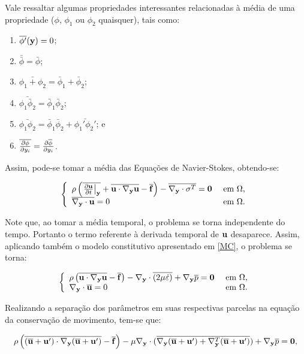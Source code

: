 \documentclass[_ArquivoPrincipal.tex]{subfiles}
\begin{document}
Vale ressaltar algumas propriedades interessantes relacionadas à média de uma propriedade ($\phi$, $\phi_1$ ou $\phi_2$ quaisquer), tais como:

\begin{enumerate}[label=\alph*.]
    \item $\overline{\phi'}(\mathbf{y})=0$;
    \item $\bar{\bar{\phi}}=\bar{\phi}$;
    \item $\bar{\phi_1+\phi_2}=\bar{\phi}_1+\bar{\phi}_2$;
    \item $\bar{\phi_1\bar{\phi}_2}=\bar{\phi}_1\bar{\phi}_2$;
    \item $\bar{\phi_1\phi_2}=\bar{\phi}_1\bar{\phi}_2+\bar{\phi_1'\phi_2'}$; e
    \item $\overline{\frac{\partial{\phi}}{\partial{y_i}}}=\frac{\partial{\overline{\phi}}}{\partial{y_i}}$.
\end{enumerate}

Assim, pode-se tomar a média das Equações de Navier-Stokes, obtendo-se:

\begin{equation}
    \left\{
   \begin{array}{ll}
        \rho\left({\overline{\left.\frac{\partial{\mathbf{u}}}{\partial{t}}\right|_{\mathbf{y}}}+\overline{\mathbf{u}\cdot\mathbf{\nabla_y}\mathbf{u}}-\overline{\mathbf{f}}}\right)-\overline{\mathbf{\nabla_y}\cdot\mathbf{\sigma}^T}=\mathbf{0}&\text{ em }\Omega\text{,}\\
        \overline{\mathbf{\nabla_y}\cdot\mathbf{u}}=0&\text{ em }\Omega\text{.}
    \end{array}
    \right.
\end{equation}

Note que, ao tomar a média temporal, o problema se torna independente do tempo. Portanto o termo referente à derivada temporal de $\mathbf{u}$ desaparece. Assim, aplicando também o modelo constitutivo apresentado em \ref{MC}, o problema se torna:

\begin{equation}
    \left\{
   \begin{array}{ll}
        \rho\left({\overline{\mathbf{u}\cdot\mathbf{\nabla_y}\mathbf{u}}-\overline{\mathbf{f}}}\right)-\mathbf{\nabla_y}\cdot\overline{(2\mu\dot{\mathbf{\varepsilon}})}+\mathbf{\nabla_y}\overline{p}=\mathbf{0}&\text{ em }\Omega\text{,}\\
        \mathbf{\nabla_y}\cdot\overline{\mathbf{u}}=0&\text{ em }\Omega\text{.}
    \end{array}
    \right.
\end{equation}

Realizando a separação dos parâmetros em suas respectivas parcelas na equação da conservação de movimento, tem-se que:

\begin{equation}
    \rho\left({\overline{(\overline{\mathbf{u}}+\mathbf{u}')\cdot\mathbf{\nabla_y}(\overline{\mathbf{u}}+\mathbf{u}')}-\overline{\mathbf{f}}}\right)-
    \mu\mathbf{\nabla_y}\cdot(\overline{\mathbf{\nabla_y}(\overline{\mathbf{u}}+\mathbf{u}')+\mathbf{\nabla}^T_\mathbf{y}(\overline{\mathbf{u}}+\mathbf{u}')})+\mathbf{\nabla_y}\overline{p}=\mathbf{0}\text{,}   
\end{equation}
\end{document}
